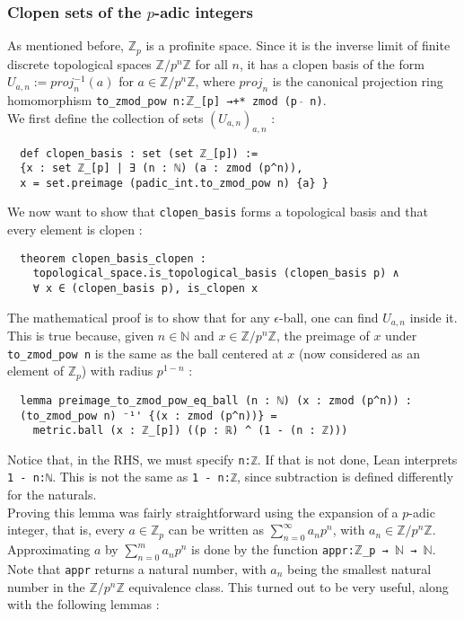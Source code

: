 \documentclass[11pt]{article}
\newcommand{\lean}[1]{\texttt{#1}\xspace} %
\begin{document}
\subsubsection{Clopen sets of the $p$-adic integers}
As mentioned before, $\mathbb{Z}_p$ is a profinite space. Since it is the inverse limit of finite
discrete topological spaces $\mathbb{Z}/p^n \mathbb{Z}$ for all $n$, it has a clopen basis of the
form $U_{a,n} := proj_n ^{-1} (a)$ for $a \in \mathbb{Z}/p^n \mathbb{Z}$, where $proj_n$ is the
canonical projection ring homomorphism \lean{to\_zmod\_pow n:$\mathbb{Z}$\_[p] →+* zmod (p $\hat{}$ n)}. \\

We first define the collection of sets $(U_{a,n})_{a,n}$ :
\begin{lstlisting}
  def clopen_basis : set (set ℤ_[p]) := 
  {x : set ℤ_[p] | ∃ (n : ℕ) (a : zmod (p^n)),
  x = set.preimage (padic_int.to_zmod_pow n) {a} }
\end{lstlisting}

We now want to show that \lean{clopen\_basis} forms a topological basis and that every element is
clopen :
\begin{lstlisting}
  theorem clopen_basis_clopen : 
    topological_space.is_topological_basis (clopen_basis p) ∧
    ∀ x ∈ (clopen_basis p), is_clopen x
\end{lstlisting}
The mathematical proof is to show that for any $\epsilon$-ball, one can find $U_{a,n}$ inside it.
This is true because, given $n \in \mathbb{N}$ and $x \in \mathbb{Z} / p^n \mathbb{Z}$, the preimage of $x$ 
under \lean{to\_zmod\_pow n} is the same as the ball centered at $x$ (now considered as an element of $\mathbb{Z}_p$) with radius $p^{1 - n}$ :
\begin{lstlisting}
  lemma preimage_to_zmod_pow_eq_ball (n : ℕ) (x : zmod (p^n)) : 
  (to_zmod_pow n) ⁻¹' {(x : zmod (p^n))} = 
    metric.ball (x : ℤ_[p]) ((p : ℝ) ^ (1 - (n : ℤ)))
\end{lstlisting}

Notice that, in the RHS, we must specify \lean{n:ℤ}. If that is not done, Lean interprets \lean{1 - n:ℕ}. This is not the same as 
\lean{1 - n:ℤ}, since subtraction is defined differently for the naturals. \\
Proving this lemma was fairly straightforward using the expansion of a $p$-adic integer, that is, every
$a \in \mathbb{Z}_p$ can be written as $\sum_{n = 0}^{\infty} a_n p^n$, with $a_n \in \mathbb{Z}/p^n \mathbb{Z}$.
Approximating $a$ by $\sum_{n = 0}^{m} a_n p^n$ is done by the function \lean{appr:$\mathbb{Z}$\_p → $\mathbb{N}$ → $\mathbb{N}$}.
Note that \lean{appr} returns a natural number, with $a_n$ being the smallest natural number in the
$\mathbb{Z}/p^n \mathbb{Z}$ equivalence class. This turned out to be very useful, along with the
following lemmas :
\end{document}
